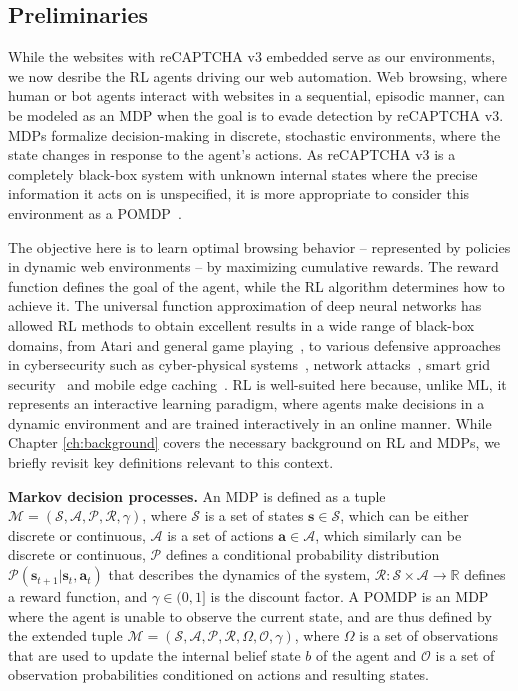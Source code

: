 \subsection{Preliminaries}

While the websites with reCAPTCHA v3 embedded serve as our environments, we now desribe the \gls{RL} agents driving our web automation.
Web browsing, where human or bot agents interact with websites in a sequential, episodic manner, can be modeled as an \gls{MDP} when the goal is to evade detection by reCAPTCHA v3.
MDPs formalize decision-making in discrete, stochastic environments, where the state changes in response to the agent's actions.
As reCAPTCHA v3 is a completely black-box system with unknown internal states where the precise information it acts on is unspecified, it is more appropriate to consider this environment as a \gls{POMDP}~\cite{kaelbling1998planning}.

The objective here is to learn optimal browsing behavior -- represented by policies in dynamic web environments -- by maximizing cumulative rewards.
The reward function defines the goal of the agent, while the \gls{RL} algorithm determines how to achieve it.
The universal function approximation of deep neural networks has allowed \gls{RL} methods to obtain excellent results in a wide range of black-box domains, from Atari and general game playing~\cite{Mnih2013}, to various defensive approaches in cybersecurity such as cyber-physical systems~\cite{Ferdowsi2018a}, network attacks~\cite{Malialis2015}, smart grid security~\cite{Ni2019} and mobile edge caching~\cite{Xiao2018a}.
\gls{RL} is well-suited here because, unlike \gls{ML}, it represents an interactive learning paradigm, where agents make decisions in a dynamic environment and are trained interactively in an online manner.
While Chapter \ref{ch:background} covers the necessary background on \gls{RL} and MDPs, we briefly revisit key definitions relevant to this context.

\textbf{Markov decision processes.}
An MDP is defined as a tuple
$\mathcal{M} = (\mathcal{S}, \mathcal{A}, \mathcal{P}, \mathcal{R}, \gamma)$, where $\mathcal{S}$ is a set of states $\mathbf{s} \in \mathcal{S}$, which can be either discrete or continuous, $\mathcal{A}$ is a set of actions $\mathbf{a} \in  \mathcal{A}$, which similarly can be discrete or continuous, $ \mathcal{P}$ defines a conditional probability distribution $ \mathcal{P}(\mathbf{s}_{t+1}|\mathbf{s}_t, \mathbf{a}_t)$ that describes the dynamics of the system, $\mathcal{R} :  \mathcal{S} \times  \mathcal{A} \to  \mathbb{R}$ defines a reward function, and $\gamma \in (0, 1]$ is the discount factor.
A \gls{POMDP} is an MDP where the agent is unable to observe the current state, and are thus defined by the extended tuple 
$\mathcal{M} = (\mathcal{S}, \mathcal{A}, \mathcal{P}, \mathcal{R}, \Omega, \mathcal{O}, \gamma)$, where $\Omega$ is a set of observations that are used to update the internal belief state $b$ of the agent and $\mathcal{O}$ is a set of observation probabilities conditioned on actions and resulting states.


